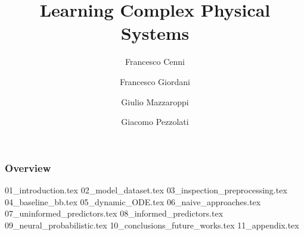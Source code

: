 \documentclass[
	10pt,
]{beamer}
\title[AI in Industry - Project]{Learning Complex Physical Systems} %
\author[FC \and FG \and GM \and GP]{\small Francesco Cenni \and Francesco Giordani \and Giulio Mazzaroppi \and Giacomo Pezzolati}
\institute[UB]{University of Bologna \\ \smallskip 

\vspace{2em}





\begin{Large} AI in Industry \end{Large}

\vspace{3em}
\textit{francesco.cenni3@studio.unibo.it \\
francesco.giordani5@studio.unibo.it \\
giulio.mazzaroppi@studio.unibo.it\\
giacomo.pezzolati@studio.unibo.it}} %
\begin{document}

\begin{frame}
	\titlepage %
\end{frame}



\begin{frame}
	\frametitle{Overview} %
	
	\tableofcontents %
\end{frame}


{01_introduction.tex}
{02_model_dataset.tex}
{03_inspection_preprocessing.tex}
{04_baseline_bb.tex}
{05_dynamic_ODE.tex}
{06_naive_approaches.tex}
{07_uninformed_predictors.tex}
{08_informed_predictors.tex}
{09_neural_probabilistic.tex}
{10_conclusions_future_works.tex}
{11_appendix.tex}


\end{document}
